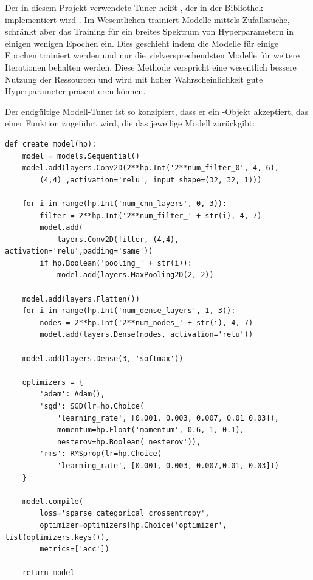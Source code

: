 Der in diesem Projekt verwendete Tuner heißt  \cite{Li2018}, der in der Bibliothek  implementiert wird \cite{Google2019a}.
Im Wesentlichen trainiert  Modelle mittels Zufallssuche, schränkt aber das Training für ein breites Spektrum von Hyperparametern in einigen wenigen Epochen ein.
Dies geschieht indem die Modelle für einige Epochen trainiert werden und nur die vielversprechendsten Modelle für weitere Iterationen behalten werden.
Diese Methode verspricht eine wesentlich bessere Nutzung der Ressourcen und wird mit hoher Wahrscheinlichkeit gute Hyperparameter präsentieren können.

Der endgültige Modell-Tuner ist so konzipiert, dass er ein -Objekt akzeptiert, das einer Funktion zugeführt wird, die das jeweilige Modell zurückgibt:


\begin{lstlisting}[caption={Funktion zum Suchen des besten Modells.}]
def create_model(hp):
    model = models.Sequential()
    model.add(layers.Conv2D(2**hp.Int('2**num_filter_0', 4, 6),
        (4,4) ,activation='relu', input_shape=(32, 32, 1)))

    for i in range(hp.Int('num_cnn_layers', 0, 3)):
        filter = 2**hp.Int('2**num_filter_' + str(i), 4, 7)
        model.add(
            layers.Conv2D(filter, (4,4), activation='relu',padding='same'))
        if hp.Boolean('pooling_' + str(i)):
            model.add(layers.MaxPooling2D(2, 2))

    model.add(layers.Flatten())
    for i in range(hp.Int('num_dense_layers', 1, 3)):
        nodes = 2**hp.Int('2**num_nodes_' + str(i), 4, 7)
        model.add(layers.Dense(nodes, activation='relu'))
    
    model.add(layers.Dense(3, 'softmax'))

    optimizers = {
        'adam': Adam(),
        'sgd': SGD(lr=hp.Choice(
            'learning_rate', [0.001, 0.003, 0.007, 0.01 0.03]),
            momentum=hp.Float('momentum', 0.6, 1, 0.1),
            nesterov=hp.Boolean('nesterov')),
        'rms': RMSprop(lr=hp.Choice(
            'learning_rate', [0.001, 0.003, 0.007,0.01, 0.03]))
    }

    model.compile(
        loss='sparse_categorical_crossentropy',
        optimizer=optimizers[hp.Choice('optimizer', list(optimizers.keys()),
        metrics=['acc'])

    return model
\end{lstlisting}

